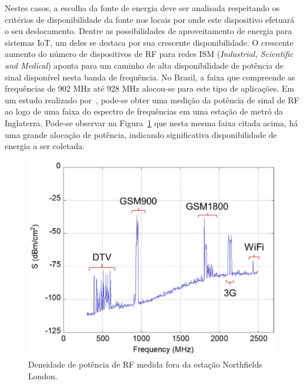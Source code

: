 Nestes casos, a escolha da fonte de energia deve ser analisada respeitando os critérios de disponibilidade da fonte nos locais por onde este dispositivo efetuará o seu deslocamento. Dentre as possibilidades de aproveitamento de energia para sistemas IoT, um deles se destaca por sua crescente disponibilidade. O crescente aumento do número de dispositivos de RF para redes ISM (\textit{Industrial, Scientific and Medical}) aponta para um caminho de alta disponibilidade de potência de sinal disponível nesta banda de frequência. No Brasil, a faixa que compreende as frequências de 902 MHz até 928 MHz alocou-se para este tipo de aplicações. Em um estudo realizado por~, pode-se obter uma medição da potência de sinal de RF ao logo de uma faixa do espectro de frequências em uma estação de metrô da Inglaterra. Pode-se observar na Figura~\ref{fig:espectro} que nesta mesma faixa citada acima, há uma grande alocação de potência, indicando significativa disponibilidade de energia a ser coletada.

\begin{figure}[h!]
  \caption{Densidade de potência de RF medida fora da estação Northfields London.}
  \begin{center}
      \includegraphics[scale=0.4]{img/espectro.png}
  \end{center}
  \label{fig:espectro}
\end{figure}
